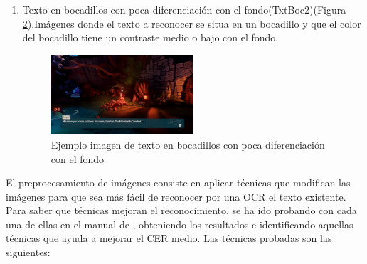 \begin{enumerate}
\begin{figure}[H]
		\label{fig:TxTBoc}
	\end{figure}
	\item Texto en bocadillos con poca diferenciación con el fondo(TxtBoc2)(Figura \ref{fig:TxtBoc2}).Imágenes donde el texto a reconocer se situa en un bocadillo y que el color del bocadillo tiene un contraste medio o bajo con el fondo.
		\begin{figure}[H]
		\centering
		\includegraphics[width = 0.5\textwidth]{Imagenes/OCR/Boc2.png}
		\caption{Ejemplo imagen de texto en bocadillos con poca diferenciación con el fondo }
		\label{fig:TxtBoc2}
	\end{figure}
\end{enumerate} 


El preprocesamiento de imágenes consiste en aplicar técnicas que modifican las imágenes para que sea más fácil de reconocer por una OCR el texto existente.
Para saber que técnicas mejoran el reconocimiento, se ha ido probando con cada una de ellas en el manual de \cite{OpenCVProcessing}, obteniendo los resultados e identificando aquellas técnicas que ayuda a mejorar el CER medio.
Las técnicas probadas son las siguientes:

